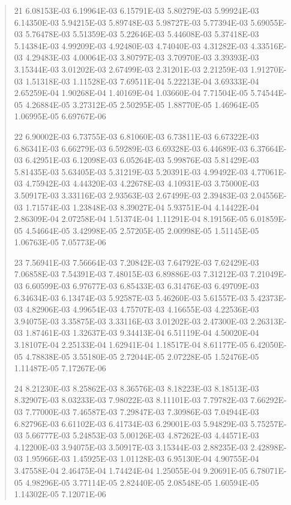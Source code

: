 \documentclass[letterpaper,10pt,english]{sphinxmanual}
\begin{document}
\begin{quote}
\begin{DUlineblock}{0em}
\item[] 21   6.08153E-03  6.19964E-03  6.15791E-03  5.80279E-03  5.99924E-03  6.14350E-03  5.94215E-03  5.89748E-03  5.98727E-03  5.77394E-03  5.69055E-03  5.76478E-03  5.51359E-03  5.22646E-03  5.44608E-03  5.37418E-03  5.14384E-03  4.99209E-03  4.92480E-03  4.74040E-03  4.31282E-03  4.33516E-03  4.29483E-03  4.00064E-03  3.80797E-03  3.70970E-03  3.39393E-03  3.15344E-03  3.01202E-03  2.67499E-03  2.31201E-03  2.21259E-03  1.91270E-03  1.51318E-03  1.11528E-03  7.69511E-04  5.22213E-04  3.69333E-04  2.65259E-04  1.90268E-04  1.40169E-04  1.03660E-04  7.71504E-05  5.74544E-05  4.26884E-05  3.27312E-05  2.50295E-05  1.88770E-05  1.46964E-05  1.06995E-05  6.69767E-06
\item[] 22   6.90002E-03  6.73755E-03  6.81060E-03  6.73811E-03  6.67322E-03  6.86341E-03  6.66279E-03  6.59289E-03  6.69328E-03  6.44689E-03  6.37664E-03  6.42951E-03  6.12098E-03  6.05264E-03  5.99876E-03  5.81429E-03  5.81435E-03  5.63405E-03  5.31219E-03  5.20391E-03  4.99492E-03  4.77061E-03  4.75942E-03  4.44320E-03  4.22678E-03  4.10931E-03  3.75000E-03  3.50917E-03  3.33116E-03  2.93563E-03  2.67499E-03  2.39483E-03  2.04556E-03  1.71574E-03  1.23848E-03  8.39027E-04  5.93751E-04  4.14422E-04  2.86309E-04  2.07258E-04  1.51374E-04  1.11291E-04  8.19156E-05  6.01859E-05  4.54664E-05  3.42998E-05  2.57205E-05  2.00998E-05  1.51145E-05  1.06763E-05  7.05773E-06
\item[] 23   7.56941E-03  7.56664E-03  7.20842E-03  7.64792E-03  7.62429E-03  7.06858E-03  7.54391E-03  7.48015E-03  6.89886E-03  7.31212E-03  7.21049E-03  6.60599E-03  6.97677E-03  6.85433E-03  6.31476E-03  6.49709E-03  6.34634E-03  6.13474E-03  5.92587E-03  5.46260E-03  5.61557E-03  5.42373E-03  4.82906E-03  4.99654E-03  4.75707E-03  4.16655E-03  4.22536E-03  3.94075E-03  3.35875E-03  3.33116E-03  3.01202E-03  2.47300E-03  2.26313E-03  1.87461E-03  1.32637E-03  9.34413E-04  6.51119E-04  4.50020E-04  3.18107E-04  2.25133E-04  1.62941E-04  1.18517E-04  8.61177E-05  6.42050E-05  4.78838E-05  3.55180E-05  2.72044E-05  2.07228E-05  1.52476E-05  1.11487E-05  7.17267E-06
\item[] 24   8.21230E-03  8.25862E-03  8.36576E-03  8.18223E-03  8.18513E-03  8.32907E-03  8.03233E-03  7.98022E-03  8.11101E-03  7.79782E-03  7.66292E-03  7.77000E-03  7.46587E-03  7.29847E-03  7.30986E-03  7.04944E-03  6.82796E-03  6.61102E-03  6.41734E-03  6.29001E-03  5.94829E-03  5.75257E-03  5.66777E-03  5.24853E-03  5.00126E-03  4.87262E-03  4.44571E-03  4.12200E-03  3.94075E-03  3.50917E-03  3.15344E-03  2.88235E-03  2.42898E-03  1.95966E-03  1.45925E-03  1.01128E-03  6.95130E-04  4.90755E-04  3.47558E-04  2.46475E-04  1.74424E-04  1.25055E-04  9.20691E-05  6.78071E-05  4.98296E-05  3.77114E-05  2.82440E-05  2.08548E-05  1.60594E-05  1.14302E-05  7.12071E-06

\end{DUlineblock}
\end{quote}
\end{document}
